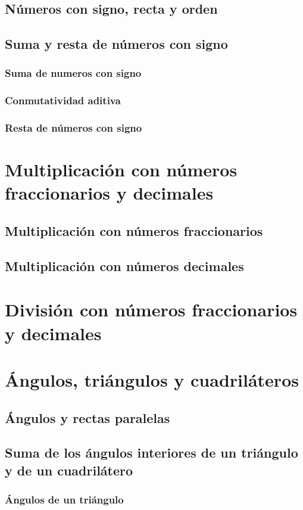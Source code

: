\documentclass[11pt]{book}
\begin{document}
\subsection{N\'umeros con signo, recta y orden}
\subsection{Suma y resta de n\'umeros con signo}
\subsubsection{Suma de numeros con signo}
\subsubsection{Conmutatividad aditiva}
\subsubsection{Resta de n\'umeros con signo}
\newpage
\section{Multiplicaci\'on con n\'umeros fraccionarios y decimales}
\subsection{Multiplicaci\'on con n\'umeros fraccionarios}
\subsection{Multiplicaci\'on con n\'umeros decimales}
\newpage
\section{Divisi\'on con n\'umeros fraccionarios y decimales}
\newpage
\section{\'Angulos, tri\'angulos y cuadril\'ateros}
\subsection{\'Angulos y rectas paralelas}
\subsection{Suma de los \'angulos interiores de un tri\'angulo y de un cuadril\'atero}
\subsubsection{\'Angulos de un tri\'angulo}
\end{document}
